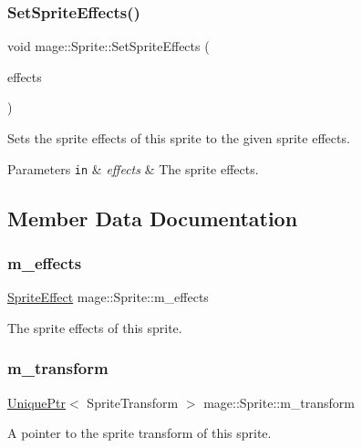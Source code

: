 \subsubsection{\texorpdfstring{Set\+Sprite\+Effects()}{SetSpriteEffects()}}
{\footnotesize\ttfamily void mage\+::\+Sprite\+::\+Set\+Sprite\+Effects (\begin{DoxyParamCaption}\item[{\hyperlink{namespacemage_a9cfe18123066ba4236f548f9de75d881}{Sprite\+Effect}}]{effects }\end{DoxyParamCaption})\hspace{0.3cm}{\ttfamily [noexcept]}}

Sets the sprite effects of this sprite to the given sprite effects.


\begin{DoxyParams}[1]{Parameters}
\mbox{\tt in}  & {\em effects} & The sprite effects. \\
\hline
\end{DoxyParams}


\subsection{Member Data Documentation}
\hypertarget{classmage_1_1_sprite_a87a51b2b131c28bad75768d14defa3c1}{}\label{classmage_1_1_sprite_a87a51b2b131c28bad75768d14defa3c1} 
\subsubsection{\texorpdfstring{m\+\_\+effects}{m\_effects}}
{\footnotesize\ttfamily \hyperlink{namespacemage_a9cfe18123066ba4236f548f9de75d881}{Sprite\+Effect} mage\+::\+Sprite\+::m\+\_\+effects\hspace{0.3cm}{\ttfamily [private]}}

The sprite effects of this sprite. \hypertarget{classmage_1_1_sprite_ae9907dd9d43fe2ce025bbc86b06dc7a3}{}\label{classmage_1_1_sprite_ae9907dd9d43fe2ce025bbc86b06dc7a3} 
\subsubsection{\texorpdfstring{m\+\_\+transform}{m\_transform}}
{\footnotesize\ttfamily \hyperlink{namespacemage_a3316d7143a973e37adf1110f2e80ca31}{Unique\+Ptr}$<$ Sprite\+Transform $>$ mage\+::\+Sprite\+::m\+\_\+transform\hspace{0.3cm}{\ttfamily [private]}}

A pointer to the sprite transform of this sprite. 